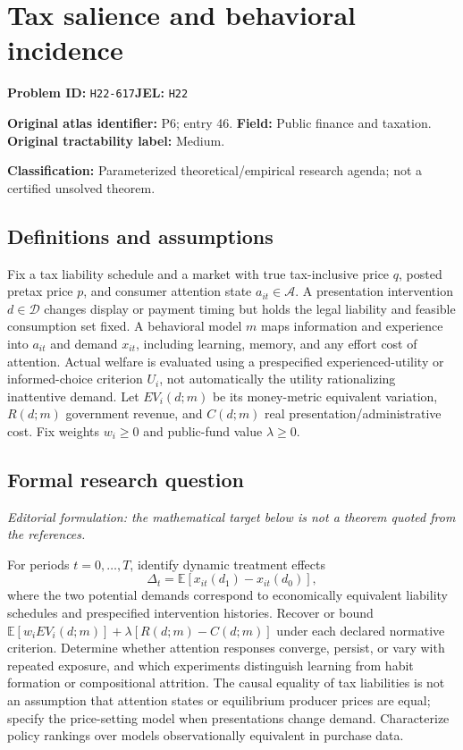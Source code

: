 \documentclass[11pt,a4paper]{article}
\begin{document}
\section*{Tax salience and behavioral incidence}
\textbf{Problem ID:} \texttt{H22-617}\quad \textbf{JEL:} \texttt{H22}\par
\label{problem:OP-0046}
\label{atlas:prob:P6}
\noindent\textbf{Original atlas identifier:} P6; entry 46. \textbf{Field:} Public finance and taxation. \textbf{Original tractability label:} Medium.

\noindent\textbf{Classification:} Parameterized theoretical/empirical research agenda; not a certified unsolved theorem.

\subsection*{Definitions and assumptions}
Fix a tax liability schedule and a market with true tax-inclusive price $q$, posted pretax price $p$, and consumer attention state $a_{it}\in\mathcal A$. A presentation intervention $d\in\mathcal D$ changes display or payment timing but holds the legal liability and feasible consumption set fixed. A behavioral model $m$ maps information and experience into $a_{it}$ and demand $x_{it}$, including learning, memory, and any effort cost of attention. Actual welfare is evaluated using a prespecified experienced-utility or informed-choice criterion $U_i$, not automatically the utility rationalizing inattentive demand. Let $EV_i(d;m)$ be its money-metric equivalent variation, $R(d;m)$ government revenue, and $C(d;m)$ real presentation/administrative cost. Fix weights $w_i\geq0$ and public-fund value $\lambda\geq0$.

\subsection*{Formal research question}
\emph{Editorial formulation: the mathematical target below is not a theorem quoted from the references.}

For periods $t=0,\ldots,T$, identify dynamic treatment effects
\[
 \Delta_t=\mathbb E[x_{it}(d_1)-x_{it}(d_0)],
\]
where the two potential demands correspond to economically equivalent liability schedules and prespecified intervention histories. Recover or bound $\mathbb E[w_iEV_i(d;m)]+\lambda[R(d;m)-C(d;m)]$ under each declared normative criterion. Determine whether attention responses converge, persist, or vary with repeated exposure, and which experiments distinguish learning from habit formation or compositional attrition. The causal equality of tax liabilities is not an assumption that attention states or equilibrium producer prices are equal; specify the price-setting model when presentations change demand. Characterize policy rankings over models observationally equivalent in purchase data.
\end{document}
